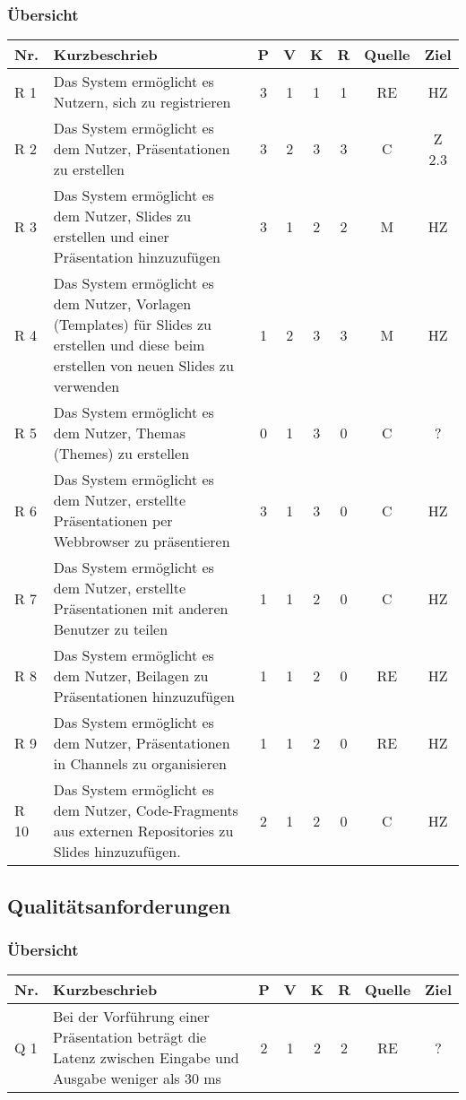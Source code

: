 \subsubsection{Übersicht}
\begingroup
\setlength{\tabcolsep}{10pt} %
\renewcommand{\arraystretch}{1.1}
\begin{tabularx}{\textwidth}{ |l|X|c|c|c|c|c|c| }
  \hline
	Nr.	&	Kurzbeschrieb	& 	P	& 	V	&	K	&	R	&	Quelle	&	Ziel	\\	\hline
	R 1	&	Das System ermöglicht es Nutzern, sich zu registrieren &	3	&	1	&	1	& 	1	&	RE	&	HZ	\\	\hline
	R 2	&	Das System ermöglicht es dem Nutzer, Präsentationen zu erstellen &	3	&	2	&	3	& 	3	&	C	&	Z 2.3	\\	\hline
	R 3	&	Das System ermöglicht es dem Nutzer, Slides zu erstellen und einer Präsentation hinzuzufügen &	3	&	1	&	2	&	2	&	M	&	HZ	\\ \hline
	R 4	&	Das System ermöglicht es dem Nutzer, Vorlagen (Templates) für Slides zu erstellen und diese beim erstellen von neuen Slides zu verwenden		&	1	&	2	& 	3	&	3	&	M	&	HZ	\\ \hline
	R 5	&	Das System ermöglicht es dem Nutzer, Themas (Themes) zu erstellen	&	0	& 	1	&	3	& 	0	&	C	&	? \\ \hline
	R 6	&	Das System ermöglicht es dem Nutzer, erstellte Präsentationen per Webbrowser zu präsentieren	&	3	& 	1	&	3	& 	0	&	C	&	HZ \\ \hline
	R 7	&	Das System ermöglicht es dem Nutzer, erstellte Präsentationen mit anderen Benutzer zu teilen	&	1	& 	1	&	2	& 	0	&	C	&	HZ \\ \hline
	R 8	&	Das System ermöglicht es dem Nutzer, Beilagen zu Präsentationen hinzuzufügen	&	1	& 	1	&	2	& 	0	&	RE	&	HZ \\ \hline
	R 9	&	Das System ermöglicht es dem Nutzer, Präsentationen in Channels zu organisieren	&	1	& 	1	&	2	& 	0	&	RE	&	HZ \\ \hline
	R 10 &	Das System ermöglicht es dem Nutzer, Code-Fragments aus externen Repositories zu Slides hinzuzufügen.	&	2	& 	1	&	2	& 	0	&	C	&	HZ \\ \hline	
\end{tabularx}
\endgroup

\subsection{Qualitätsanforderungen}

\subsubsection{Übersicht}
\begingroup
\setlength{\tabcolsep}{10pt} %
\renewcommand{\arraystretch}{1.5}
\begin{tabularx}{\textwidth}{ |l|X|c|c|c|c|c|c| }
  \hline
	Nr.	&	Kurzbeschrieb	& 	P	& 	V	&	K	&	R	&	Quelle	&	Ziel \\	\hline
	Q 1	&	Bei der Vorführung einer Präsentation beträgt die Latenz zwischen Eingabe und Ausgabe weniger als 30 ms	&	2	&	1	&	2	& 	2	&	RE	&	?	\\	\hline
\end{tabularx}
\endgroup